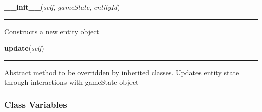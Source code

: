     \vspace{0.5ex}

\hspace{.8\funcindent}\begin{boxedminipage}{\funcwidth}

    \raggedright \textbf{\_\_init\_\_}(\textit{self}, \textit{gameState}, \textit{entityId})

    \vspace{-1.5ex}

    \rule{\textwidth}{0.5\fboxrule}
\setlength{\parskip}{2ex}
    Constructs a new entity object

\setlength{\parskip}{1ex}
    \end{boxedminipage}

    \label{Birds:Entity:Entity:update}

    \vspace{0.5ex}

\hspace{.8\funcindent}\begin{boxedminipage}{\funcwidth}

    \raggedright \textbf{update}(\textit{self})

    \vspace{-1.5ex}

    \rule{\textwidth}{0.5\fboxrule}
\setlength{\parskip}{2ex}
    Abstract method to be overridden by inherited classes. Updates entity 
    state through interactions with gameState object

\setlength{\parskip}{1ex}
    \end{boxedminipage}



  \subsubsection{Class Variables}

